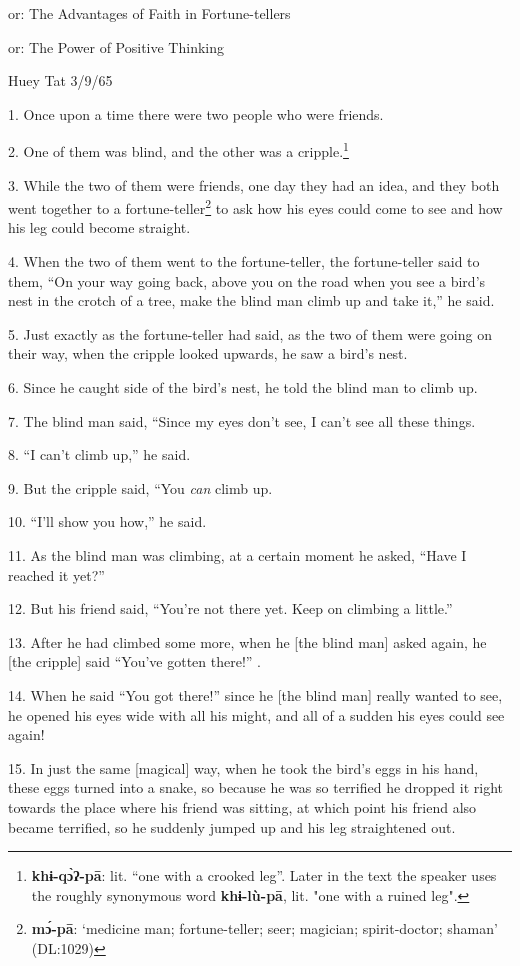 \setcounter{footnote}{0}

or: The Advantages of Faith in Fortune-tellers

or: The Power of Positive Thinking

Huey Tat 3/9/65

1. Once upon a time there were two people who were friends.

2. One of them was blind, and the other was a cripple.\footnote{\textbf{khɨ-qɔ̀ʔ-pā}: lit. ``one with a crooked leg''. Later in the text the speaker uses the roughly synonymous word \textbf{khɨ-lù-pā}, lit. "one with a ruined leg".}

3. While the two of them were friends, one day they had an idea, and they both
went together to a fortune-teller\footnote{\textbf{mɔ́-pā}: `medicine man; fortune-teller; seer; magician; spirit-doctor; shaman' (DL:1029)} to ask how his eyes could come to see and
how his leg could become straight.

4. When the two of them went to the fortune-teller, the fortune-teller said to
them, ``On your way going back, above you on the road when you see a bird's nest
in the crotch of a tree, make the blind man climb up and take it,'' he said.

5. Just exactly as the fortune-teller had said, as the two of them were going on
their way, when the cripple looked upwards, he saw a bird's nest.

6. Since he caught side of the bird's nest, he told the blind man to climb up.

7. The blind man said, ``Since my eyes don't see, I can't see all these things.

8. ``I can't climb up,'' he said.

9. But the cripple said, ``You \textit{can} climb up.

10. ``I'll show you how,'' he said.

11. As the blind man was climbing, at a certain moment he asked, ``Have I reached
it yet?''

12. But his friend said, ``You're not there yet. Keep on climbing a little.''

13. After he had climbed some more, when he [the blind man] asked again, he [the
cripple] said ``You've gotten there!'' .

14. When he said ``You got there!'' since he [the blind man] really wanted to see,
he opened his eyes wide with all his might, and all of a sudden his eyes could
see again!

15. In just the same [magical] way, when he took the bird's eggs in his hand, these
eggs turned into a snake, so because he was so terrified he dropped it right towards
the place where his friend was sitting, at which point his friend also became terrified,
so he suddenly jumped up and his leg straightened out.


